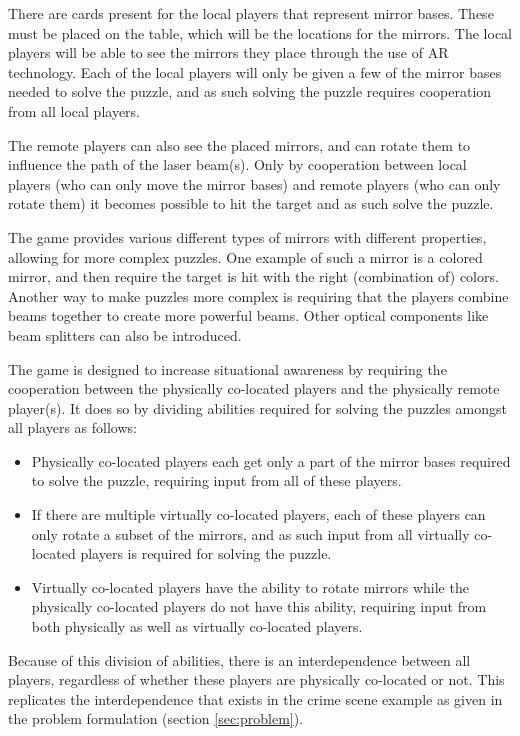 		There are cards present for the local players that represent mirror 
		bases. These must be placed on the table, which will be the locations 
		for the mirrors. The local players will be able to see the mirrors they 
		place through the use of AR technology. Each of the local players will 
		only be given a few of the mirror bases needed to solve the puzzle, and 
		as such solving the puzzle requires cooperation from all local players.
		
		The remote players can also see the placed mirrors, and can rotate them 
		to influence the path of the laser beam(s). Only by cooperation between 
		local players (who can only move the mirror bases) and remote players 
		(who can only rotate them) it becomes possible to hit the target and as 
		such solve the puzzle.
		
		The game provides various different types of mirrors with different 
		properties, allowing for more complex puzzles. One example of such a 
		mirror is a colored mirror, and then require the target is hit with the 
		right (combination of) colors. Another way to make puzzles more complex 
		is requiring that the players combine beams together to create more 
		powerful beams. Other optical components like beam splitters can also be 
		introduced.
		
		The game is designed to increase situational awareness by requiring the 
		cooperation between the physically co-located players and the physically 
		remote player(s). It does so by dividing abilities required for solving
		the puzzles amongst all players as follows:
		
		\begin{itemize}
			\item Physically co-located players each get only a part of the 
			      mirror bases required to solve the puzzle, requiring input 
			      from all of these players.
			\item If there are multiple virtually co-located players, each of 
			      these players can only rotate a subset of the mirrors, and 
			      as such input from all virtually co-located players is 
			      required for solving the puzzle. 
			\item Virtually co-located players have the ability to rotate 
			      mirrors while the physically co-located players do not have 
			      this ability, requiring input from both physically as well
			      as virtually co-located players.
		\end{itemize}

		Because of this division of abilities, there is an interdependence 
		between all players, regardless of whether these players are physically 
		co-located or not. This replicates the interdependence that exists in 
		the crime scene example as given in the problem formulation (section 
		\ref{sec:problem}).